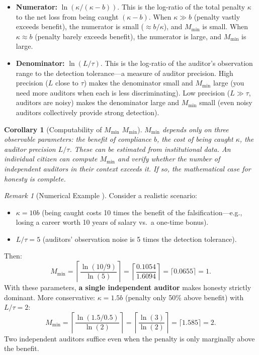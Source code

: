 \documentclass[11pt,a4paper]{article}
\newtheorem{corollary}[theorem]{Corollary}
\theoremstyle{definition}
\theoremstyle{remark}
\newtheorem{remark}[theorem]{Remark}
\newcommand{\threshold}{\tau}
\newcommand{\tol}{L}
\newcommand{\cost}{\kappa}
\begin{document}
\begin{itemize}[nosep]
    \item \textbf{Numerator:} $\ln(\cost/(\cost - b))$. This is the log-ratio of the total penalty $\cost$ to the net loss from being caught $(\cost - b)$. When $\cost \gg b$ (penalty vastly exceeds benefit), the numerator is small ($\approx b/\cost$), and $M_{\min}$ is small. When $\cost \approx b$ (penalty barely exceeds benefit), the numerator is large, and $M_{\min}$ is large.
    \item \textbf{Denominator:} $\ln(\tol/\threshold)$. This is the log-ratio of the auditor's observation range to the detection tolerance---a measure of auditor precision. High precision ($\tol$ close to $\threshold$) makes the denominator small and $M_{\min}$ large (you need more auditors when each is less discriminating). Low precision ($\tol \gg \threshold$, auditors are noisy) makes the denominator large and $M_{\min}$ small (even noisy auditors collectively provide strong detection).
\end{itemize}

\begin{corollary}[Computability of $M_{\min}$ $M_{\min}$]
\label{cor:computable}
$M_{\min}$ depends only on three observable parameters: the benefit of compliance $b$, the cost of being caught $\cost$, the auditor precision $\tol/\threshold$. These can be estimated from institutional data. An individual citizen can compute $M_{\min}$ and verify whether the number of independent auditors in their context exceeds it. If so, the mathematical case for honesty is complete.
\end{corollary}

\begin{remark}[Numerical Example ]
\label{rem:Mmin_example}
Consider a realistic scenario:
\begin{itemize}[nosep]
    \item $\cost = 10b$ (being caught costs 10 times the benefit of the falsification---e.g., losing a career worth 10 years of salary vs.\ a one-time bonus).
    \item $\tol/\threshold = 5$ (auditors' observation noise is 5 times the detection tolerance).
\end{itemize}
Then:
\begin{equation}
    M_{\min} = \left\lceil \frac{\ln(10/9)}{\ln(5)} \right\rceil
    = \left\lceil \frac{0.1054}{1.6094} \right\rceil
    = \lceil 0.0655 \rceil = 1.
\end{equation}
With these parameters, \textbf{a single independent auditor} makes honesty strictly dominant. More conservative: $\cost = 1.5b$ (penalty only 50\% above benefit) with $\tol/\threshold = 2$:
\begin{equation}
    M_{\min} = \left\lceil \frac{\ln(1.5/0.5)}{\ln(2)} \right\rceil
    = \left\lceil \frac{\ln(3)}{\ln(2)} \right\rceil
    = \lceil 1.585 \rceil = 2.
\end{equation}
Two independent auditors suffice even when the penalty is only marginally above the benefit.
\end{remark}
\end{document}
